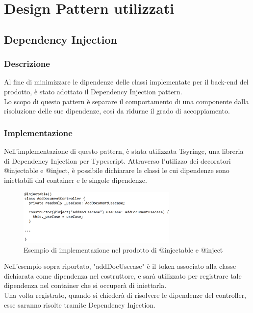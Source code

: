 \section{Design Pattern utilizzati} \label{sec:designpatt}

\subsection{Dependency Injection}
\subsubsection{Descrizione}
Al fine di minimizzare le dipendenze delle classi implementate per il back-end del prodotto, è stato adottato il Dependency Injection pattern.\\
Lo scopo di questo pattern è separare il comportamento di una componente dalla risoluzione delle sue dipendenze, così da ridurne il grado di accoppiamento.
\subsubsection{Implementazione}
Nell'implementazione di questo pattern, è stata utilizzata Tsyringe, una libreria di Dependency Injection per Typescript. Attraverso l'utilizzo dei decoratori @injectable e @inject, è possibile dichiarare le classi le cui dipendenze sono iniettabili dal container e le singole dipendenze.\\

\begin{figure}[h!]
    \centering  
    \includegraphics[width=0.7\textwidth]{DIinjectable.png}
    \caption{Esempio di implementazione nel prodotto di @injectable e @inject}
\end{figure}

\noindent Nell'esempio sopra riportato, "addDocUsecase" è il token associato alla classe dichiarata come dipendenza nel costruttore, e sarà utilizzato per registrare tale dipendenza nel container che si occuperà di iniettarla.\\
Una volta registrato, quando si chiederà di risolvere le dipendenze del controller, esse saranno risolte tramite Dependency Injection.

